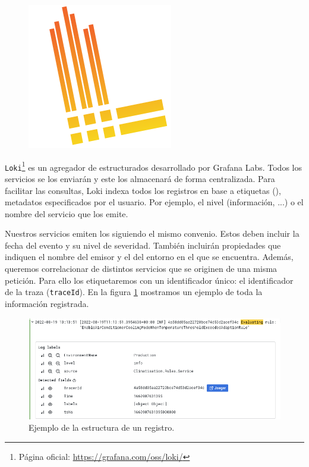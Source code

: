 \begin{figure}
  \vspace{-7pt}
  \hspace{-10pt}
  \centering
  \includegraphics[scale=0.85]{cap_despliegue/images/Loki}
\end{figure}

\texttt{Loki}\footnote{Página oficial: \url{https://grafana.com/oss/loki/}} es un agregador de  estructurados desarrollado por Grafana Labs. Todos los servicios se los enviarán y este los almacenará de forma centralizada. Para facilitar las consultas, Loki indexa todos los registros en base a etiquetas (), metadatos especificados por el usuario. Por ejemplo, el nivel (información, ...) o el nombre del servicio que los emite.

Nuestros servicios emiten los  siguiendo el mismo convenio. Estos deben incluir la fecha del evento y su nivel de severidad. También incluirán propiedades que indiquen el nombre del emisor y el del entorno en el que se encuentra. Además, queremos correlacionar  de distintos servicios que se originen de una misma petición. Para ello los etiquetaremos con un identificador único: el identificador de la traza (\texttt{traceId}). En la figura \ref{fig:loki-ejemplo-logs} mostramos un ejemplo de toda la información registrada.

\begin{figure}[h]
  \centering
  \includegraphics[scale=0.5]{cap_despliegue/images/Ejemplo-log}
  \caption{Ejemplo de la estructura de un registro.}
  \label{fig:loki-ejemplo-logs}
\end{figure}

